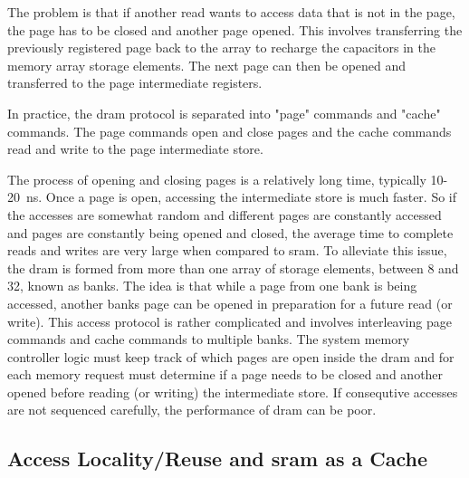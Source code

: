 \iffalse
The value charged on the capacitors are transferred to the page intermediate store and all further reads and writes are to this intermediate store. 

When a different page is accessed, the contents of the page intermediate store has to be returned to the memory array and the capacitors recharged.
The new page can then be transferred to the intermediate store for accessing.
\fi

\iffalse The issue with \acp{dram} is when a storage cell is read, the capacitor is discharged. In addition, sensing this discharging capacitor takes a long time when compared to the \ac{sram} cell.\fi

The problem is that if another read wants to access data that is not in the page, the page has to be closed and another page opened. 
This involves transferring the previously registered page back to the array to recharge the capacitors in the memory array storage elements. 
The next page can then be opened and transferred to the page intermediate registers.

In practice, the \ac{dram} protocol is separated into "page" commands and "cache" commands. The page commands open and close pages and the cache commands read and write to the page intermediate store.

The process of opening and closing pages is a relatively long time, typically 10-20\SI[per-mode=symbol]{}{\nano\second}. Once a page is open, accessing the intermediate store is much faster.
So if the accesses are somewhat random and different pages are constantly accessed and pages are constantly being opened and closed, the average time to complete reads and writes are very large when compared to \ac{sram}.
To alleviate this issue, the \ac{dram} is formed from more than one array of storage elements, between 8 and 32, known as banks. The idea is that while a page from one bank is being accessed, another banks page can be opened in preparation for a future read (or write).
This access protocol is rather complicated and involves interleaving page commands and cache commands to multiple banks. 
The system memory controller logic must keep track of which pages are open inside the \ac{dram} and for each memory request must determine if a page needs to be closed and another opened before reading (or writing) the intermediate store.
If consequtive accesses are not sequenced carefully, the performance of \ac{dram} can be poor.


\subsection{Access Locality/Reuse and \ac{sram} as a Cache}
\label{Access Locality/Reuse and Cache}

